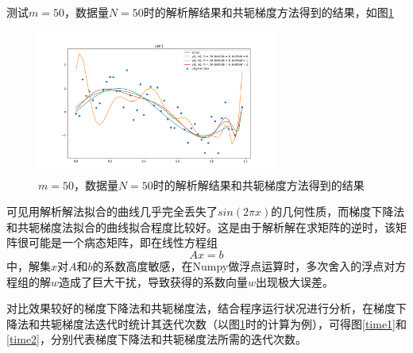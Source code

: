 测试$m = 50$，数据量$N = 50$时的解析解结果和共轭梯度方法得到的结果，如图\ref{m50}

\begin{figure}[htbp]
    \centering
    \includegraphics[width=0.7\textwidth]{figures/Figure_16.png}
    \caption{$m = 50$，数据量$N = 50$时的解析解结果和共轭梯度方法得到的结果}
    \label{m50}
\end{figure}

可见用解析解法拟合的曲线几乎完全丢失了$sin(2 \pi x)$的几何性质，而梯度下降法和共轭梯度法拟合的曲线拟合程度比较好。这是由于解析解在求矩阵的逆时，该矩阵很可能是一个病态矩阵\cite{ref4}，即在线性方程组
\begin{equation}
    A x = b
\end{equation}
中，解集$x$对$A$和$b$的系数高度敏感，在Numpy做浮点运算时，多次舍入的浮点对方程组的解$w$造成了巨大干扰，导致获得的系数向量$w$出现极大误差。

对比效果较好的梯度下降法和共轭梯度法，结合程序运行状况进行分析，在梯度下降法和共轭梯度法迭代时统计其迭代次数（以图\ref{m50}时的计算为例），可得图\ref{time1}和\ref{time2}，分别代表梯度下降法和共轭梯度法所需的迭代次数。

